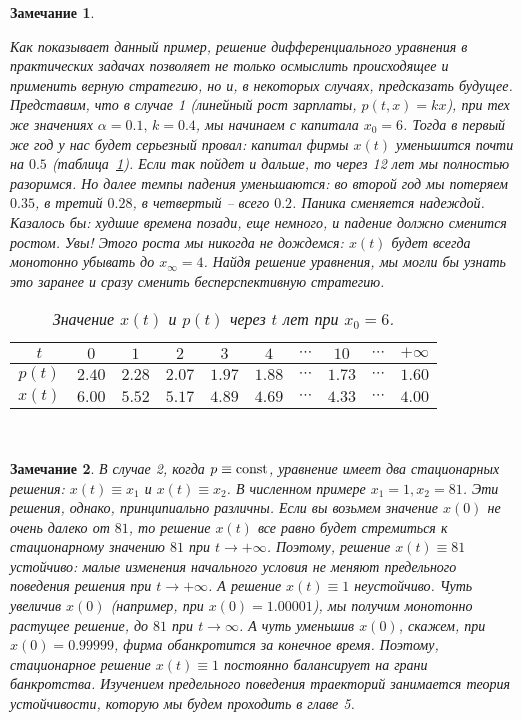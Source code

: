 \documentclass[12pt,a4paper]{article}
\newtheorem{remark}{Замечание}
\begin{document}
\begin{remark}\label{r.firm-r10}
{\em Как показывает данный пример, решение дифференциального уравнения в практических задачах позволяет не 
только осмыслить происходящее и применить верную стратегию, но и, в некоторых случаях, предсказать будущее. 
Представим, что в случае 1 (линейный рост зарплаты, $p(t, x) = kx$), при тех же значениях $\alpha = 0.1, \, k = 0.4$, мы начинаем с капитала $x_0 = 6$. Тогда в первый же год у нас будет серьезный провал: 
капитал фирмы $x(t)$ уменьшится почти на $0.5$ (таблица~\ref{tab1}). Если так пойдет и дальше, то через 12 лет   мы полностью разоримся. Но далее темпы падения уменьшаются: во второй год 
мы потеряем $0.35$, в третий $0.28$, в четвертый -- всего $0.2$. Паника сменяется надеждой. 
Казалось бы: худшие времена позади, еще немного, и падение должно сменится ростом. Увы! Этого роста мы никогда не дождемся: 
$x(t)$ будет всегда монотонно убывать до $x_{\infty} = 4$.  Найдя решение уравнения, мы могли бы узнать это заранее и сразу сменить бесперспективную стратегию.     

\begin{table}[thb]
\begin{center}
\begin{tabular}{|c|c|c|c|c|c|c|c|c|c|}\hline
 $t$ & $0$ & $1$ & $2$ & $3$ & $4$ &   $\cdots$ & $10$ & $\cdots$ &  $+\infty$ \\
 \hline 
  $p(t)$ & $2.40$ & $2.28$ & $2.07$ & $1.97$ & $1.88$ & $\cdots$ & $1.73$ & $\cdots$ & $1.60$ \\
  \hline 
  $x(t)$ & $6.00$ & $5.52$ & $5.17$ & $4.89$ & $4.69$ & $\cdots$ & $4.33$ & $\cdots$ & $4.00$ \\
 \hline

\end{tabular} \\[2mm]
\caption{Значение $x(t)$ и $p(t)$ через $t$ лет при $x_0 = 6$.}
\label{tab1}
\end{center}
\end{table}    
  }
\end{remark}
\begin{remark}\label{r.firm-r20}
{\em В случае 2, когда $p \equiv {\rm const}$, уравнение имеет два стационарных решения: 
$x(t)  \equiv x_1$ и $x(t) \equiv x_2$. В численном примере $x_1 = 1, x_2 = 81$. 
Эти решения, однако, принципиально различны. 
Если вы возьмем значение $x(0)$ не очень далеко от $81$, то решение $x(t)$ все равно будет 
стремиться к стационарному  значению $81$ при $t \to +\infty$. Поэтому, решение $x(t) \equiv 81$ {\em устойчиво}: малые изменения начального условия не меняют предельного поведения решения 
при $t \to +\infty$. 
А решение $x(t) \equiv 1$ неустойчиво. Чуть увеличив $x(0)$ (например, при $x(0) = 1.00001$), мы получим монотонно растущее решение,  до $81$ при $t \to \infty$. 
А чуть уменьшив $x(0)$, скажем, при $x(0) = 0.99999$, фирма обанкротится за конечное время. 
Поэтому, стационарное решение $x(t) \equiv 1$ постоянно балансирует на грани банкротства. Изучением предельного поведения траекторий занимается теория устойчивости, которую мы будем проходить в главе 5. 
}
\end{remark}
\end{document}
